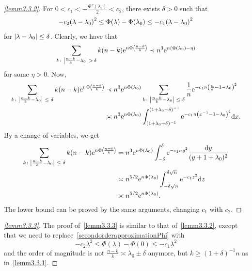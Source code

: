 \documentclass[AHL,Unicode,longabstracts]{cedram}
\newcommand{\rme}{\mathrm{e}}
\newcommand{\rmd}{\mathrm{d}}
\let\originalleft\left
\let\originalright\right
\renewcommand{\left}{\mathopen{}\mathclose\bgroup\originalleft}
\renewcommand{\right}{\aftergroup\egroup\originalright}
\let\oldle\le
\renewcommand{\le}{\mathchoice{\oldle}{\oldle}{\,\oldle\,}{\,\oldle\,}}
\begin{document}
\begin{proofc}
\begin{proof}[{\eqref{lemm3.3.2}}]
For $0 < c_1 < - \frac{\Phi''(\lambda_0)}{2} < c_2$, there exists $\delta > 0$ such that
\begin{equation}\label{secondorderapproximationPhi}
- c_2 \left(\lambda - \lambda_0 \right)^2 \leq \Phi(\lambda) - \Phi(\lambda_0) \leq - c_1 \left(\lambda - \lambda_0 \right)^2
\end{equation}
for $\left| \lambda - \lambda_0 \right| \leq \delta$. Clearly, we have that
\[
\sum_{k \colon \left\lvert \frac{n - k}{k} - \lambda_0 \right\rvert\,>\,\delta} k (n - k) \rme^{n \Phi \left(\!\frac{n - k}{k}\!\right)} \prec n^3 \rme^{n \left(\Phi(\lambda_0) - \eta \right)}
\]
for some $\eta > 0$. Now,
\begin{align*}
\sum_{k \colon \left\lvert\frac{n - k}{k} - \lambda_0 \right\rvert \le \delta} k (n - k) \rme^{n \Phi \left(\!\frac{n - k}{k}\!\right)}
&\prec n^3 \rme^{n \Phi(\lambda_0)} \sum_{k \colon \left\lvert \frac{n - k}{k} - \lambda_0 \right\rvert \le \delta} \frac{1}{n} \rme^{- c_1 n \left(\frac{n}{k} - 1 - \lambda_0 \right)^2} \\
&\asymp n^3 \rme^{n \Phi(\lambda_0)} \int_{(1 + \lambda_0 + \delta)^{-1}}^{(1 + \lambda_0 - \delta)^{-1}} \rme^{- c_1 n \left(x^{-1} - 1 - \lambda_0 \right)^2} \rmd x.
\end{align*}
By a change of variables, we get
\begin{align*}
\sum_{k \colon \left\lvert \frac{n - k}{k} - \lambda_0 \right\rvert \le \delta} k (n - k) \rme^{n \Phi \left(\!\frac{n - k}{k}\!\right)}
&= n^3 \rme^{n \Phi(\lambda_0)} \int_{- \delta}^{\delta} \rme^{-c_1 n y^2} \frac{\rmd y}{(y + 1 + \lambda_0)^2} \\
&\asymp n^{5/2} \rme^{n \Phi(\lambda_0)} \int_{- \delta \sqrt{n}}^{\delta \sqrt{n}} \rme^{- c_1 z^2} \rmd z \\
&\asymp n^{ 5 / 2} \rme^{n \Phi(\lambda_0)}.
\end{align*}
The lower bound can be proved by the same arguments, changing $c_1$ with $c_2$.\let\qed\relax
\end{proof}

\begin{proof}[{\eqref{lemm3.3.3}}]
The proof of~\eqref{lemm3.3.3} is similar to that of~\eqref{lemm3.3.2}, except that we need to replace~\eqref{secondorderapproximationPhi} with
\[
- c_2 \lambda^2 \leq \Phi(\lambda) - \Phi(0) \leq - c_1 \lambda ^2
\]
and the order of magnitude is not $\frac{n-k}{k}\asymp \lambda_0\pm \delta$ anymore, but $k\geq (1+\delta)^{-1}n$ as in~\eqref{lemm3.3.1}. \qedhere
\end{proof}\let\qed\relax
\end{proofc}
\end{document}
